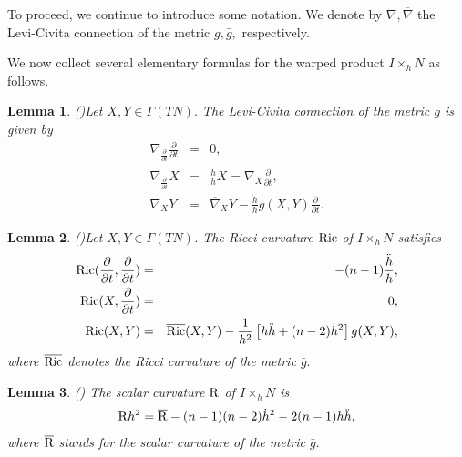 \documentclass[10pt,leqno,oneside]{amsart}
\newtheorem{Lem}{Lemma}
\begin{document}
{             To proceed, we continue to introduce some notation. We denote by $\nabla,\overline{\nabla}$ the Levi-Civita connection of the metric $g,\bar{g},$ respectively.

             We now collect several elementary formulas for the warped product $I\times_hN $ as follows.
    \begin{Lem}{\rm{(\cite{Bess1987})}}\label{LCofw}
             Let $X, Y\in\Gamma(TN ).$ The Levi-Civita connection of the metric $g$ is given by
          \begin{eqnarray}\label{geo}
          \nabla_{\frac{\partial}{\partial t}}\frac{\partial}{\partial t}  &=& 0, \\\label{partialX}
          \nabla_{\frac{\partial}{\partial t}}X &=&\frac{\dot{h}}{h}X=\nabla_{X}\frac{\partial}{\partial t}, \\\label{partialXY}
          \nabla_{X}Y &=&\overline{\nabla}_XY-\frac{\dot{h}}{h}g(X,Y)\frac{\partial}{\partial t}.
        \end{eqnarray}
    \end{Lem}
    \begin{Lem}{\rm{(\cite[Proposition 9.106]{Bess1987})}}\label{Ricw}
            Let $X, Y\in\Gamma(TN )$. The Ricci curvature ${\rm{Ric}}$ of $I\times_h N $ satisfies
        \begin{eqnarray}\label{Ric1}
          {\rm{Ric}}(\frac{\partial}{\partial t},\frac{\partial}{\partial t})  &=& -(n-1)\frac{\ddot{h}}{h}, \\\label{Ric2}
          {\rm{Ric}}(X,\frac{\partial}{\partial t}) &=&0, \\\label{Ric3}
          {\rm{Ric}}(X,Y) &=& \overline{{\rm{Ric}}}(X,Y)-\frac{1}{h^2}\left[h\ddot{h}+(n-2)\dot{h}^2\right]g(X,Y),
        \end{eqnarray}
            where $\overline{{\rm{Ric}}}$ denotes the Ricci curvature of the metric $\bar{g}.$
    \end{Lem}
    \begin{Lem}{\rm{(\cite{Bess1987})}}
            The scalar curvature ${\rm{R}}$ of $I\times_h N $ is
        \begin{equation}\label{RbarR}
          {\rm{R}}h^2=\overline{{\rm{R}}}-(n-1)(n-2)\dot{h}^2-2(n-1)h\ddot{h},
        \end{equation}
            where $\overline{{\rm{R}}}$ stands for the scalar curvature of the metric $\bar{g}.$
    \end{Lem}

}
\end{document}
